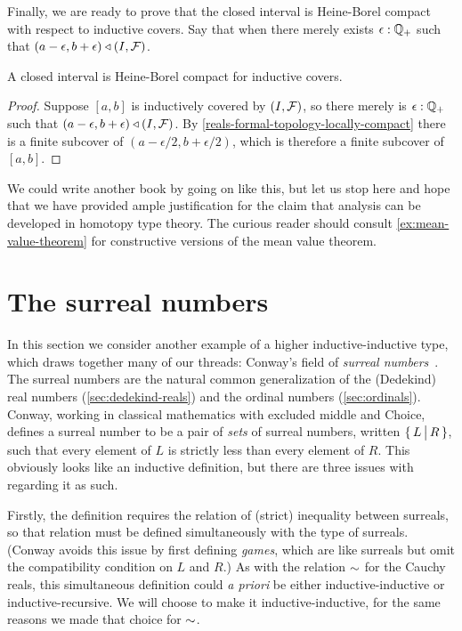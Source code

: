Finally, we are ready to prove that the closed interval is Heine-Borel compact with
respect to inductive covers. Say that  when there merely exists $\epsilon : \mathbb{Q}_{+}$ such that $(a - \epsilon, b +
\epsilon) \triangleleft {\mathopen{}(I, \mathcal{F})\mathclose{}}$.

\begin{cor} \label{interval-Heine-Borel}
  A closed interval is Heine-Borel compact for inductive covers.
\end{cor}

\begin{proof}
  Suppose $[a, b]$ is inductively covered by ${\mathopen{}(I, \mathcal{F})\mathclose{}}$, so there merely is
  $\epsilon : \mathbb{Q}_{+}$ such that $(a - \epsilon, b + \epsilon) \triangleleft {\mathopen{}(I, \mathcal{F})\mathclose{}}$.
  By \autoref{reals-formal-topology-locally-compact} there is a finite subcover of
  $(a - \epsilon/2, b + \epsilon/2)$, which is therefore a finite subcover of $[a, b]$.
\end{proof}

We could write another book by going on like this, but let us stop here and hope that we
have provided ample justification for the claim that analysis can be developed in homotopy
type theory. The curious reader should consult \autoref{ex:mean-value-theorem} for
constructive versions of the mean value theorem.

\section{The surreal numbers}
\label{sec:surreals}

In this section we consider another example of a higher inductive-inductive type, which draws together many of our threads: Conway's field \NO of \emph{surreal numbers}~\cite{conway:onag}.
The surreal numbers are the natural common generalization of the (Dedekind) real numbers (\autoref{sec:dedekind-reals}) and the ordinal numbers (\autoref{sec:ordinals}).
Conway, working in classical mathematics with excluded middle and Choice, defines a surreal number to be a pair of \emph{sets} of surreal numbers, written $\{\,L\,\big|\,R\,\}$, such that every element of $L$ is strictly less than every element of $R$.
This obviously looks like an inductive definition, but there are three issues with regarding it as such.

Firstly, the definition requires the relation of (strict) inequality between surreals, so that relation must be defined simultaneously with the type \NO of surreals.
(Conway avoids this issue by first defining \emph{games}, which are like surreals but omit the compatibility condition on $L$ and $R$.)
As with the relation $\mathord\sim$ for the Cauchy reals, this simultaneous definition could \emph{a priori} be either inductive-inductive or inductive-recursive.
We will choose to make it inductive-inductive, for the same reasons we made that choice for $\mathord\sim$.


